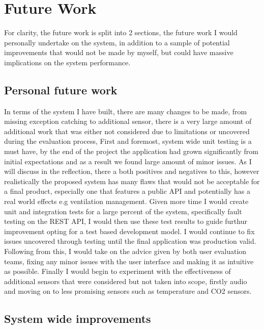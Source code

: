 \documentclass{l4proj}
\begin{document}
\section{Future Work}

For clarity, the future work is split into 2 sections, the future work I would personally undertake on the system, in addition to a sample of potential improvements that would not be made by myself, but could have massive implications on the system performance.

\subsection{Personal future work}

In terms of the system I have built, there are many changes to be made, from missing exception catching to additional sensor, there is a very large amount of additional work that was either not considered due to limitations or uncovered during the evaluation process, First and foremost, system wide unit testing is a must have, by the end of the project the application had grown significantly from initial expectations and as a result we found large amount of minor issues. As I will discuss in the reflection, there a both positives and negatives to this, however realistically the proposed system has many flaws that would not be acceptable for a final product, especially one that features a public API and potentially has a real world effects e.g ventilation management. Given more time I would create unit and integration tests for a large percent of the system, specifically fault testing on the REST API, I would then use these test results to guide furthur improvement opting for a test based development model. I would continue to fix issues uncovered through testing until the final application was production valid. Following from this, I would take on the advice given by both user evaluation teams, fixing any minor issues with the user interface and making it as intuitive as possible. Finally I would begin to experiment with the effectiveness of additional sensors that were considered but not taken into scope, firstly audio and moving on to less promising sensors such as temperature and CO2 sensors.


\subsection{System wide improvements}
\end{document}
